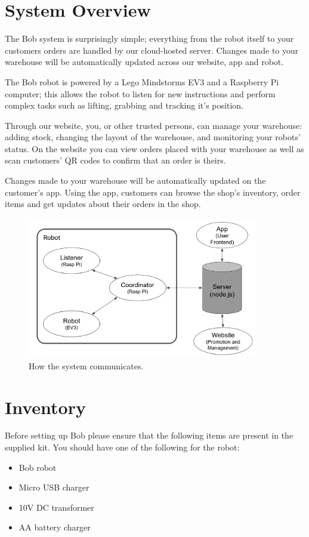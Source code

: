 \documentclass[onecolumn]{IEEEtran}
\begin{document}
{\let\clearpage\relax \section{System Overview}}
The Bob system is surprisingly simple; everything from the robot itself to your customers orders are handled by our cloud-hosted server. Changes made to your warehouse will be automatically updated across our website, app and robot. 
\par The Bob robot is powered by a Lego Mindstorms EV3 and a Raspberry Pi computer; this allows the robot to listen for new instructions and perform complex tasks such as lifting, grabbing and tracking it’s position.
\par Through our website, you, or other trusted persons, can manage your warehouse: adding stock, changing the layout of the warehouse, and monitoring your robots’ status. On the website you can view orders placed with your warehouse as well as scan customers’ QR codes to confirm that an order is theirs. 
\par Changes made to your warehouse will be automatically updated on the customer’s app. Using the app, customers can browse the shop’s inventory, order items and get updates about their orders in the shop.
\begin{figure}[H]
    \begin{center}
    \includegraphics[width=0.9\textwidth]{sys.png}
    \caption{How the system communicates.}
    \label{fig: figure}
    \end{center}
\end{figure}

\section{Inventory}
Before setting up Bob please ensure that the following items are present in the supplied kit. You should have one of the following for the robot:
\begin{itemize}
    \item Bob robot
    \item Micro USB charger
    \item 10V DC transformer
    \item AA battery charger 
\end{itemize}
\end{document}
